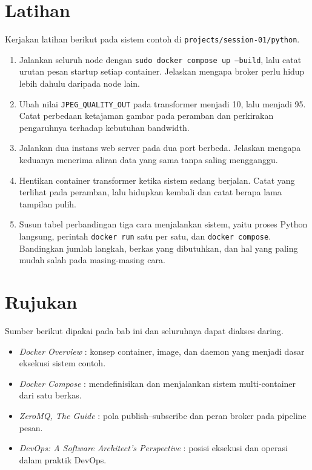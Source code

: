 \section{Latihan}

Kerjakan latihan berikut pada sistem contoh di \texttt{projects/session-01/python}.

\begin{enumerate}
  \item Jalankan seluruh node dengan \texttt{sudo docker compose up --build}, lalu catat urutan pesan startup setiap container. Jelaskan mengapa broker perlu hidup lebih dahulu daripada node lain.
  \item Ubah nilai \texttt{JPEG\_QUALITY\_OUT} pada transformer menjadi 10, lalu menjadi 95. Catat perbedaan ketajaman gambar pada peramban dan perkirakan pengaruhnya terhadap kebutuhan bandwidth.
  \item Jalankan dua instans web server pada dua port berbeda. Jelaskan mengapa keduanya menerima aliran data yang sama tanpa saling mengganggu.
  \item Hentikan container transformer ketika sistem sedang berjalan. Catat yang terlihat pada peramban, lalu hidupkan kembali dan catat berapa lama tampilan pulih.
  \item Susun tabel perbandingan tiga cara menjalankan sistem, yaitu proses Python langsung, perintah \texttt{docker run} satu per satu, dan \texttt{docker compose}. Bandingkan jumlah langkah, berkas yang dibutuhkan, dan hal yang paling mudah salah pada masing-masing cara.
\end{enumerate}

\section{Rujukan}

Sumber berikut dipakai pada bab ini dan seluruhnya dapat diakses daring.

\begin{itemize}
  \item \textit{Docker Overview} \cite{doc-docker}: konsep container, image, dan daemon yang menjadi dasar eksekusi sistem contoh.
  \item \textit{Docker Compose} \cite{doc-compose}: mendefinisikan dan menjalankan sistem multi-container dari satu berkas.
  \item \textit{ZeroMQ, The Guide} \cite{zguide}: pola publish--subscribe dan peran broker pada pipeline pesan.
  \item \textit{DevOps: A Software Architect's Perspective} \cite{bass2015devops}: posisi eksekusi dan operasi dalam praktik DevOps.
\end{itemize}
